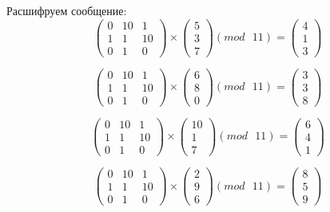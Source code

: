 \documentclass[a5paper, 10pt]{article}
\theoremstyle{definition}
\theoremstyle{plain}
\theoremstyle{remark}
\begin{document}
Расшифруем сообщение:
\begin{equation}
\begin{pmatrix}
 0 & 10 & 1 \\
1 & 1 & 10\\
0 & 1 & 0
\end{pmatrix}
 \times
\begin{pmatrix}
 5\\
3\\
7
\end{pmatrix}
(mod \text{ }11)
= \begin{pmatrix}
4 \\
1\\
3
\end{pmatrix}
\end{equation}

\begin{equation}
\begin{pmatrix}
  0 & 10 & 1 \\
1 & 1 & 10\\
0 & 1 & 0
\end{pmatrix}
 \times
\begin{pmatrix}
6\\
8\\
0
\end{pmatrix}
(mod \text{ }11)
= \begin{pmatrix}
3 \\
3\\
8
\end{pmatrix}
\end{equation}

\begin{equation}
\begin{pmatrix}
 0 & 10 & 1 \\
1 & 1 & 10\\
0 & 1 & 0
\end{pmatrix}
 \times
\begin{pmatrix}
 10\\
1\\
7
\end{pmatrix}
(mod \text{ }11)
= \begin{pmatrix}
6 \\
4\\
1
\end{pmatrix}
\end{equation}

\begin{equation}
\begin{pmatrix}
 0 & 10 & 1 \\
1 & 1 & 10\\
0 & 1 & 0
\end{pmatrix}
 \times
\begin{pmatrix}
2\\
9\\
6
\end{pmatrix}
(mod \text{ }11)
= \begin{pmatrix}
8 \\
5\\
9
\end{pmatrix}
\end{equation}
\end{document}

